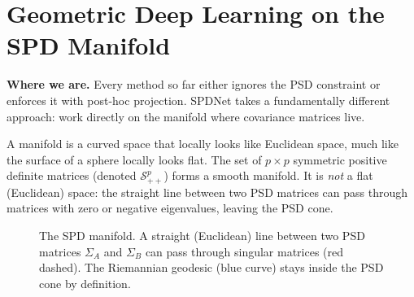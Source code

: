 \section{Geometric Deep Learning on the SPD Manifold}\label{sec:multivariate:spd}

\textbf{Where we are.}  Every method so far either ignores the PSD constraint
or enforces it with post-hoc projection. SPDNet takes a fundamentally different
approach: work directly on the manifold where covariance matrices live.

\begin{prereq}
A manifold is a curved space that locally looks like Euclidean space, much like
the surface of a sphere locally looks flat. The set of $p \times p$ symmetric
positive definite matrices (denoted $\mathcal{S}_{++}^p$) forms a smooth
manifold. It is \emph{not} a flat (Euclidean) space: the straight line
between two PSD matrices can pass through matrices with zero or negative
eigenvalues, leaving the PSD cone.
\end{prereq}

\begin{figure}[ht]
\centering
{}
\caption{The SPD manifold. A straight (Euclidean) line between two PSD matrices
$\Sigma_A$ and $\Sigma_B$ can pass through singular matrices (red dashed). The
Riemannian geodesic (blue curve) stays inside the PSD cone by definition.}
\label{fig:spd-manifold}
\end{figure}

